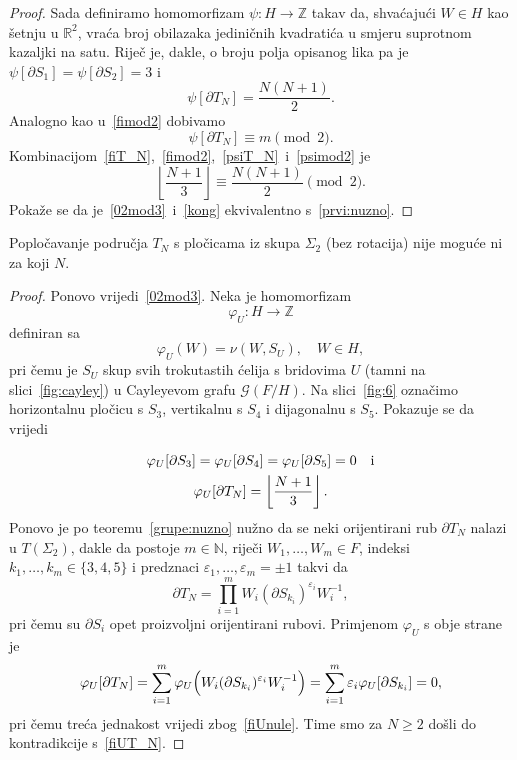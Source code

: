 \documentclass[11pt]{scrartcl}
\begin{document}
\begin{proof}
Sada definiramo homomorfizam $\psi\colon H\to \mathbb{Z}$ takav da, shvaćajući $W\in H$ kao šetnju u $\mathbb{R}^2$, vraća broj obilazaka jediničnih kvadratića u smjeru suprotnom kazaljki na satu. Riječ je, dakle, o broju polja opisanog lika pa je $\psi[\partial S_1] = \psi[\partial S_2] = 3$ i
\begin{equation}\label{psiT_N}
\psi[\partial T_N] = \frac{N(N+1)}2.
\end{equation}
Analogno kao u~\eqref{fimod2} dobivamo
\begin{equation}\label{psimod2}
\psi[\partial T_N] \equiv m \pmod{2}.
\end{equation}
Kombinacijom~\eqref{fiT_N},~\eqref{fimod2},~\eqref{psiT_N}~i~\eqref{psimod2} je
\begin{equation} \label{kong}
\left\lfloor  \frac{N+1}{3} \right\rfloor \equiv \frac{N(N+1)}2 \pmod{2}.
\end{equation}
Pokaže se da je~\eqref{02mod3}~i~\eqref{kong} ekvivalentno s~\eqref{prvi:nuzno}.
\end{proof}


\begin{teorem} \label{teorem:grupe2}
Popločavanje područja $T_N$ s pločicama iz skupa $\Sigma_2$ (bez rotacija) nije moguće ni za koji $N$.
\end{teorem}

\begin{proof}
Ponovo vrijedi~\eqref{02mod3}. Neka je homomorfizam \[\varphi_U\colon H\to \mathbb{Z}\] definiran sa 
\[\varphi_U(W) = \nu(W, S_U), \quad W \in H,\]
pri čemu je $S_U$ skup svih trokutastih ćelija s bridovima $U$ (tamni na slici~\ref{fig:cayley}) u Cayleyevom grafu $\mathcal{G}(F/H)$. Na slici~\eqref{fig:6} označimo horizontalnu pločicu s $S_3$, vertikalnu s $S_4$ i dijagonalnu s $S_5$. Pokazuje se da vrijedi

\begin{gather}
\varphi_U [\partial S_3] = \varphi_U[\partial S_4] = \varphi_U[\partial S_5] = 0 \quad \text i \label{fiUnule}\\ 
\varphi_U [\partial T_N] = \left\lfloor  \frac{N+1}{3} \right\rfloor. \label{fiUT_N}
\end{gather}
Ponovo je po teoremu~\ref{grupe:nuzno} nužno da se neki orijentirani rub $\partial T_N$ nalazi u $T(\Sigma_2)$, dakle da postoje $m \in \mathbb{N}$, riječi $W_1,\ldots,W_m \in F$, indeksi $k_1,\ldots,k_m \in \{3,4,5\}$ i predznaci $\varepsilon_1,\ldots,\varepsilon_m = \pm 1$ takvi da
\[
\partial T_N = \prod \limits_{i = 1}^m W_i (\partial S_{k_i})^{\varepsilon_i} W_i^{-1},
\]
pri čemu su $\partial S_i$ opet proizvoljni orijentirani rubovi. Primjenom $\varphi_U$ s obje strane je
\begin{equation*}
\varphi_U [\partial T_N] = \sum \limits_{i=1}^m \varphi_U\Bigl( W_i (\partial S_{k_i})^{\varepsilon_i} W_i^{-1} \Bigr)
= \sum \limits_{i=1}^m \varepsilon_i \varphi_U[\partial S_{k_i}] =0,
\end{equation*}
pri čemu treća jednakost vrijedi zbog~\eqref{fiUnule}. Time smo za $N \geq 2$ došli do kontradikcije s~\eqref{fiUT_N}.
\end{proof}
\end{document}
